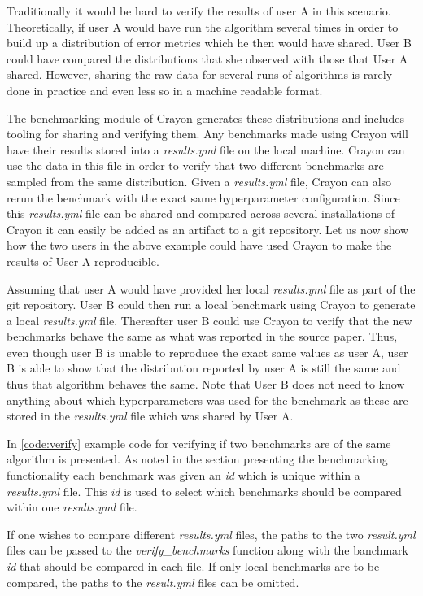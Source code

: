 Traditionally it would be hard to verify the results of user A in this scenario. Theoretically, if user A would have run the algorithm several times in order to build up a distribution of error metrics which he then would have shared. User B could have compared the distributions that she observed with those that User A shared. However, sharing the raw data for several runs of algorithms is rarely done in practice and even less so in a machine readable format. 

The benchmarking module of Crayon generates these distributions and includes tooling for sharing and verifying them. Any benchmarks made using Crayon will have their results stored into a \textit{results.yml} file on the local machine. Crayon can use the data in this file in order to verify that two different benchmarks are sampled from the same distribution. Given a \textit{results.yml} file, Crayon can also rerun the benchmark with the exact same hyperparameter configuration. Since this \textit{results.yml} file can be shared and compared across several installations of Crayon it can easily be added as an artifact to a git repository. Let us now show how the two users in the above example could have used Crayon to make the results of User A reproducible. 

Assuming that user A would have provided her local \textit{results.yml} file as part of the git repository. User B could then run a local benchmark using Crayon to generate a local \textit{results.yml} file. Thereafter user B could use Crayon to verify that the new benchmarks behave the same as what was reported in the source paper. Thus, even though user B is unable to reproduce the exact same values as user A, user B is able to show that the distribution reported by user A is still the same and thus that algorithm behaves the same. Note that User B does not need to know anything about which hyperparameters was used for the benchmark as these are stored in the \textit{results.yml} file which was shared by User A. 

In \ref{code:verify} example code for verifying if two benchmarks are of the same algorithm is presented. As noted in the section presenting the benchmarking functionality each benchmark was given an \textit{id} which is unique within a \textit{results.yml} file. This \textit{id} is used to select which benchmarks should be compared within one \textit{results.yml} file. 

If one wishes to compare different \textit{results.yml} files, the paths to the two \textit{result.yml} files can be passed to the \textit{verify\_benchmarks} function along with the banchmark \textit{id} that should be compared in each file. If only local benchmarks are to be compared, the paths to the \textit{result.yml} files can be omitted.

